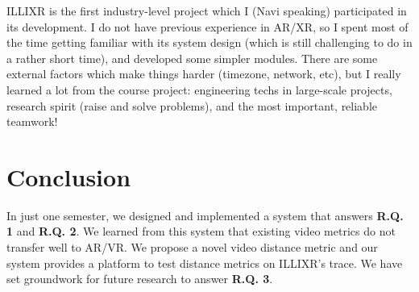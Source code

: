


ILLIXR is the first industry-level project which I (Navi speaking) participated in its development. I do not have previous experience in AR/XR, so I spent most of the time getting familiar with its system design (which is still challenging to do in a rather short time), and developed some simpler modules. There are some external factors which make things harder (timezone, network, etc), but I really learned a lot from the course project: engineering techs in large-scale projects, research spirit (raise and solve problems), and the most important, reliable teamwork!

\section{Conclusion}

In just one semester, we designed and implemented a system that answers \textbf{R.Q. 1} and \textbf{R.Q. 2}.
We learned from this system that existing video metrics do not transfer well to AR/VR.
We propose a novel video distance metric and our system provides a platform to test distance metrics on ILLIXR's trace.
We have set groundwork for future research to answer \textbf{R.Q. 3}.
